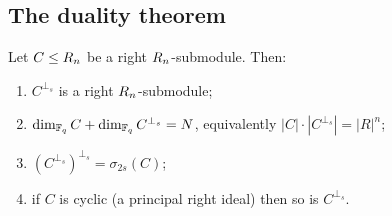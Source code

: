 \subsection{The duality theorem}

\begin{theorem}\label{thm:duality}
Let $C\le R_n$ be a right $R_n$-submodule. Then:
\begin{enumerate}[label=\textnormal{(\alph*)},leftmargin=*]
\item $C^{\perp_s}$ is a right $R_n$-submodule;
\item $\dim_{\mathbb F_q}C+\dim_{\mathbb F_q}C^{\perp_s}=N$, equivalently
  $|C|\cdot|C^{\perp_s}|=|R|^n$;
\item $(C^{\perp_s})^{\perp_s}=\sigma_{2s}(C)$;
\item if $C$ is cyclic (a principal right ideal) then so is $C^{\perp_s}$.
\end{enumerate}
\end{theorem}

